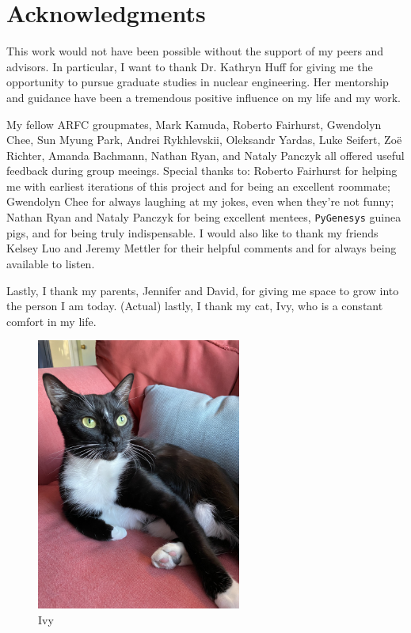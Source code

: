 \documentclass[edeposit,fullpage,11pt]{uiucthesis2018}
\begin{document}
\chapter*{Acknowledgments}

This work would not have been possible without the support of my peers and
advisors. In particular, I want to thank Dr. Kathryn Huff for giving me the
opportunity to pursue graduate studies in nuclear engineering. Her mentorship and
guidance have been a tremendous positive influence on my life and my work.

My fellow ARFC groupmates, Mark Kamuda, Roberto Fairhurst, Gwendolyn Chee,
Sun Myung Park, Andrei Rykhlevskii, Oleksandr Yardas, Luke Seifert, Zo\"e Richter,
Amanda Bachmann, Nathan Ryan, and Nataly Panczyk all offered useful feedback
during group meeings. Special thanks to: Roberto Fairhurst for helping me with
earliest iterations of this project and for being an excellent roommate; Gwendolyn
Chee for always laughing at my jokes, even when they're not funny; Nathan Ryan
and Nataly Panczyk for being excellent mentees, \texttt{PyGenesys} guinea pigs,
and for being truly indispensable.
I would also like to thank my friends Kelsey Luo and Jeremy Mettler for their
helpful comments and for always being available to listen.

Lastly, I thank my parents, Jennifer and David, for giving me space to grow
into the person I am today. (Actual) lastly, I thank my cat, Ivy, who is a
constant comfort in my life.

\begin{figure}[H]
  \centering
  \includegraphics[width=0.6\textwidth]{figures/ivy}
  \caption*{Ivy}
  \label{fig:ivy}
\end{figure}
\end{document}
